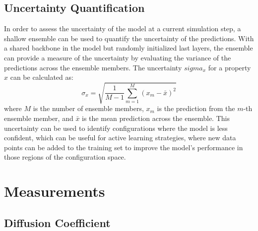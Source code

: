 \subsection{Uncertainty Quantification}

In order to assess the uncertainty of the model at a current simulation step, a shallow ensemble can be used to quantify the uncertainty of the predictions. With a shared backbone in the model but randomly initialized last layers, the ensemble can provide a measure of the uncertainty by evaluating the variance of the predictions across the ensemble members. The uncertainty \(sigma_x\) for a property \(x\) can be calculated as:
\begin{equation}
    \sigma_x = \sqrt{\frac{1}{M-1} \sum_{m=1}^{M} (x_m - \bar{x})^2}
\end{equation}
where \(M\) is the number of ensemble members, \(x_m\) is the prediction from the \(m\)-th ensemble member, and \(\bar{x}\) is the mean prediction across the ensemble.
This uncertainty can be used to identify configurations where the model is less confident, which can be useful for active learning strategies, where new data points can be added to the training set to improve the model's performance in those regions of the configuration space.

\section{Measurements}

\subsection{Diffusion Coefficient}

